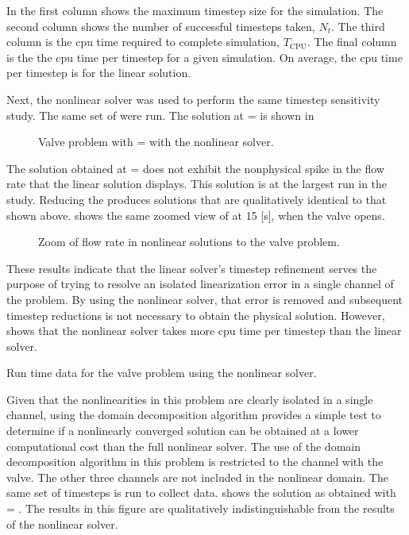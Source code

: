 In  the first column shows the maximum timestep size for the simulation.
The second column shows the number of successful timesteps taken, $N_{t}$.
The third column is the cpu time required to complete simulation, $T_{\text{CPU}}$.
The final column is the the cpu time per timestep for a given simulation.
On average, the cpu time per timestep is  for the linear solution.

Next, the nonlinear solver was used to perform the same timestep sensitivity study.
The same set of \dtmax{} were run.
The solution at \dtmax{} =  is shown in 

\begin{figure}[h!t]
\centering

\caption{Valve problem with \dtmax{} =  with the nonlinear solver.}
\label{fig:valveNln6pt25em02}
\end{figure}

The solution obtained at \dtmax{} =  does not exhibit the nonphysical spike in the flow rate that the linear solution displays.
This solution is at the largest \dt{} run in the study.
Reducing the \dtmax{} produces solutions that are qualitatively identical to that shown above.
 shows the same zoomed view of at 15 [s], when the valve opens.

\begin{figure}[h!t]
\centering

\caption{Zoom of flow rate in nonlinear solutions to the valve problem.}
\label{fig:valveNlnSols}
\end{figure}

These results indicate that the linear solver's timestep refinement serves the purpose of trying to resolve an isolated linearization error in a single channel of the problem.
By using the nonlinear solver, that error is removed and subsequent timestep reductions is not necessary to obtain the physical solution.
However,  shows that the nonlinear solver takes more cpu time per timestep than the linear solver.

\begin{table}[h!t]
\centering
\singlespace

\caption{Run time data for the valve problem using the nonlinear solver.}
\label{tab:valveNlnTable}
\end{table}

Given that the nonlinearities in this problem are clearly isolated in a single channel, using the domain decomposition algorithm provides a simple test to determine if a nonlinearly converged solution can be obtained at a lower computational cost than the full nonlinear solver.
The use of the domain decomposition algorithm in this problem is restricted to the channel with the valve.
The other three channels are not included in the nonlinear domain.
The same set of timesteps is run to collect data.
 shows the solution as obtained with \dtmax{} = .
The results in this figure are qualitatively indistinguishable from the results of the nonlinear solver.

